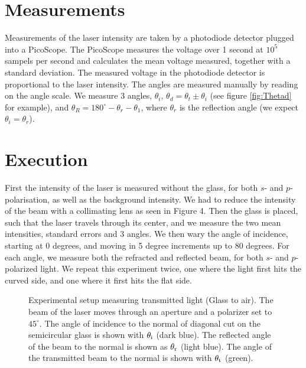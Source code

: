 \section{Measurements}
Measurements of the laser intensity are taken by a photodiode detector plugged into a PicoScope\autocite{PicoScope3203D}. 
The PicoScope measures the voltage over 1 second at $10^{5}$ sampels per second and calculates the mean voltage measured, together with a standard deviation.  
The measured voltage in the photodiode detector is proportional to the laser intensity. 
The angles are measured manually by reading on the angle scale. We measure 3 angles, $\theta_i$, $\theta_d = \theta_t \pm \theta_i$ (see figure \ref{fig:Thetad} for example), and $\theta_R = 180^\circ - \theta_r - \theta_1$, where $\theta_r$ is the reflection angle (we expect $\theta_i = \theta_r$).
%
%
\section{Execution}
First the intensity of the laser is measured without the glass, for both $s$- and $p$-polarisation, as well as the background intensity. We had to reduce the intensity of the beam with a collimating lens as seen in Figure 4.
Then the glass is placed, such that the laser \mbox{travels} through its center, and we measure the two mean intensities, standard errors and 3 angles. 
We then wary the angle of incidence, starting at 0 degrees, and moving in 5 degree increments up to 80 degrees. 
For each angle, we measure both the refracted and reflected beam, for both $s$- and $p$-polarized light.
We repeat this experiment twice, one where the light first hits the curved side, and one where it first hits the flat side.

\begin{figure}[t]
    \centering
    
    \caption{Experimental setup measuring transmitted light (Glass to air). The beam of the laser moves through an aperture and a polarizer set to $45^{\circ}$. The angle of incidence to the normal of diagonal cut on the semicircular glass is shown with $\theta_{\textup{i}}$ (dark blue). The reflected angle of the beam to the normal is shown as $\theta_{\textup{r}}$ (light blue). The angle of the transmitted beam to the normal is shown with $\theta_{\textup{t}}$ (green).}
    \label{fig:ExpsetupGlassToAir}
\end{figure}
    
